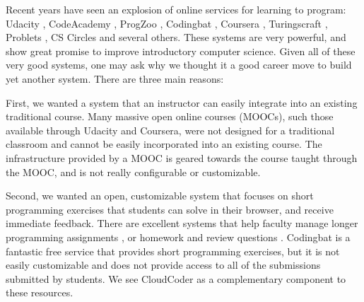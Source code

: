\documentclass{sig-alternate}
\begin{document}
Recent years have seen an explosion of online services for learning
to program:  Udacity \cite{udacity}, CodeAcademy \cite{codeacademy},
ProgZoo \cite{progzoo}, 
Codingbat \cite{codingbat}, Coursera \cite{coursera}, Turingscraft
\cite{turingscraft}, Problets \cite{Kumar:2005:GPA:1163405.1163408}, CS Circles \cite{Pritchard:2013:CCI:2445196.2445370} and
several others.  These systems are very powerful, and show great promise to
improve introductory computer science.  Given all of these
very good systems, one may ask why we thought it a good career move
to build yet another system.  There are three main reasons:


First, we wanted a system that an instructor can easily integrate into an existing traditional course.
  Many massive open online courses (MOOCs), such those available through Udacity and
  Coursera, were not designed for a traditional classroom and cannot be easily incorporated into an existing course.  
  The infrastructure provided by a MOOC is geared towards the course
  taught through the MOOC, and is not really configurable or customizable.


Second, we wanted an open, customizable system that focuses on short programming exercises that students
  can solve in their browser, and receive immediate feedback.  There are excellent systems that help
  faculty manage longer programming assignments
  \cite{Edwards:2008:WAG:1384271.1384371}, or homework and review questions
  \cite{turingscraft, Kumar:2005:GPA:1163405.1163408}.  Codingbat
  \cite{codingbat} is a fantastic free service that provides short
  programming exercises, but it is not easily customizable and does not provide
  access to all of the submissions submitted by students.
  We see CloudCoder as a complementary component to these resources.

\end{document}
